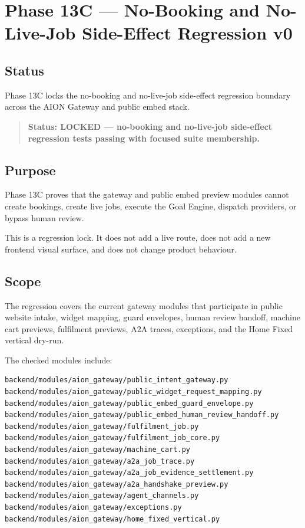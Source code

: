 \section{Phase 13C --- No-Booking and No-Live-Job Side-Effect Regression v0}
\label{sec:aion-phase13c-no-booking-side-effect-regression-v0}

\subsection{Status}

Phase 13C locks the no-booking and no-live-job side-effect regression boundary across the AION Gateway and public embed stack.

\begin{quote}
\textbf{Status: LOCKED --- no-booking and no-live-job side-effect regression tests passing with focused suite membership.}
\end{quote}

\subsection{Purpose}

Phase 13C proves that the gateway and public embed preview modules cannot create bookings, create live jobs, execute the Goal Engine, dispatch providers, or bypass human review.

This is a regression lock. It does not add a live route, does not add a new frontend visual surface, and does not change product behaviour.

\subsection{Scope}

The regression covers the current gateway modules that participate in public website intake, widget mapping, guard envelopes, human review handoff, machine cart previews, fulfilment previews, A2A traces, exceptions, and the Home Fixed vertical dry-run.

The checked modules include:

\begin{verbatim}
backend/modules/aion_gateway/public_intent_gateway.py
backend/modules/aion_gateway/public_widget_request_mapping.py
backend/modules/aion_gateway/public_embed_guard_envelope.py
backend/modules/aion_gateway/public_embed_human_review_handoff.py
backend/modules/aion_gateway/fulfilment_job.py
backend/modules/aion_gateway/fulfilment_job_core.py
backend/modules/aion_gateway/machine_cart.py
backend/modules/aion_gateway/a2a_job_trace.py
backend/modules/aion_gateway/a2a_job_evidence_settlement.py
backend/modules/aion_gateway/a2a_handshake_preview.py
backend/modules/aion_gateway/agent_channels.py
backend/modules/aion_gateway/exceptions.py
backend/modules/aion_gateway/home_fixed_vertical.py
\end{verbatim}

